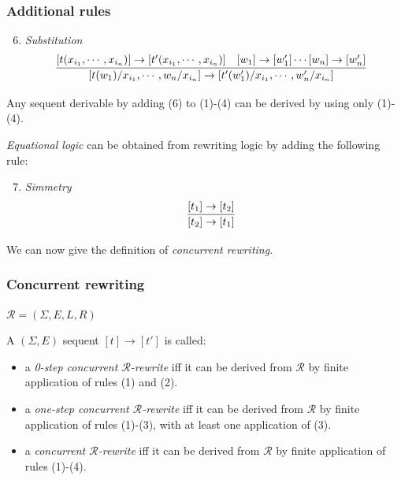 \documentclass{beamer}
\begin{document}
\begin{frame}
    \frametitle{Additional rules}
    \scriptsize
    \begin{enumerate}
        \setcounter{enumi}{5}
        \item \emph{Substitution}
        $$
        \infer[]
        {[t(w_1)/x_{i_1},\cdots,w_n/x_{i_n}] \rightarrow [t'(w_1')/x_{i_1},\cdots,w_n'/x_{i_n}]}
        {[t(x_{i_1},\cdots,x_{i_n})] \rightarrow [t'(x_{i_1},\cdots,x_{i_n})] \quad [w_1] \rightarrow [w_1'] \cdots [w_n] \rightarrow [w_n']} 
        $$
    \end{enumerate}
    
    Any sequent derivable by adding (6) to  (1)-(4) can be derived by using only (1)-(4).

    \pause 
    \bigskip
    \emph{Equational logic} can be obtained  from rewriting logic by adding the following rule:
    \begin{enumerate}
        \setcounter{enumi}{6}
        \item \emph{Simmetry}
        $$
        \infer[]{[t_2] \rightarrow [t_1]}{[t_1] \rightarrow [t_2]} 
        $$
    \end{enumerate}
    \pause 
    
    \bigskip 
    We can now give the definition of \emph{concurrent rewriting}.
\end{frame}
\begin{frame}
    \frametitle{Concurrent rewriting}
    $\mathcal{R} = (\Sigma, E, L, R)$
    \small
    
    \pause
    \medskip
    A $(\Sigma, E)$ sequent $[t] \rightarrow [t']$ is called:\begin{itemize}
        \item a \emph{0-step concurrent $\mathcal{R}$-rewrite} iff it can be derived from $\mathcal{R}$ by finite application 
        of rules (1) and (2).
        \pause
        \item a \emph{one-step concurrent $\mathcal{R}$-rewrite} iff it can be derived from $\mathcal{R}$
        by finite application of rules (1)-(3), with at least one application of (3).
        \pause
        \item a \emph{concurrent $\mathcal{R}$-rewrite} iff it can be derived from $\mathcal{R}$ by finite application   of rules (1)-(4).
    \end{itemize}
\end{frame}
\end{document}
